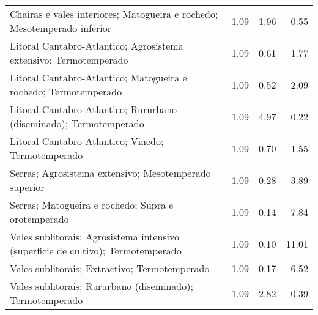 \begin{table}[p]
\begin{tabular}{lrrr}
  Chairas e vales interiores; Matogueira e rochedo; Mesotemperado inferior & 1.09 & 1.96 & 0.55 \\ 
  Litoral Cantabro-Atlantico; Agrosistema extensivo; Termotemperado & 1.09 & 0.61 & 1.77 \\ 
  Litoral Cantabro-Atlantico; Matogueira e rochedo; Termotemperado & 1.09 & 0.52 & 2.09 \\ 
  Litoral Cantabro-Atlantico; Rururbano (diseminado); Termotemperado & 1.09 & 4.97 & 0.22 \\ 
  Litoral Cantabro-Atlantico; Vinedo; Termotemperado & 1.09 & 0.70 & 1.55 \\ 
  Serras; Agrosistema extensivo; Mesotemperado superior & 1.09 & 0.28 & 3.89 \\ 
  Serras; Matogueira e rochedo; Supra e orotemperado & 1.09 & 0.14 & 7.84 \\ 
  Vales sublitorais; Agrosistema intensivo (superficie de cultivo); Termotemperado & 1.09 & 0.10 & 11.01 \\ 
  Vales sublitorais; Extractivo; Termotemperado & 1.09 & 0.17 & 6.52 \\ 
  Vales sublitorais; Rururbano (diseminado); Termotemperado & 1.09 & 2.82 & 0.39 \\ 
   \hline
\end{tabular}
\end{table}
